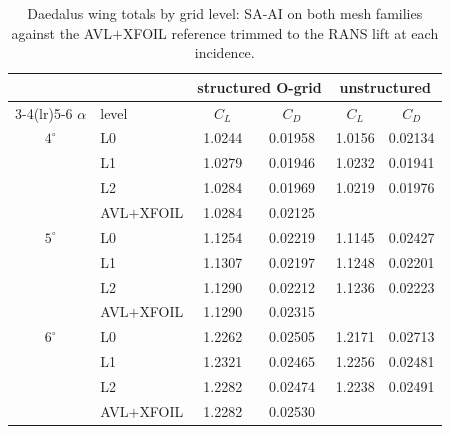 \documentclass[10pt]{article}
\begin{document}
\begin{table}[H]
  \centering\small
  \caption{Daedalus wing totals by grid level: SA-AI on both mesh
  families against the AVL$+$XFOIL reference trimmed to the RANS lift
  at each incidence.}
  \label{t:daetotals}
  \begin{tabular}{cl cc cc}
    \toprule
    & & \multicolumn{2}{c}{structured O-grid} & \multicolumn{2}{c}{unstructured}\\
    \cmidrule(lr){3-4}\cmidrule(lr){5-6}
    $\alpha$ & level & $C_L$ & $C_D$ & $C_L$ & $C_D$\\
    \midrule
    $4^\circ$ & L0 & 1.0244 & 0.01958 & 1.0156 & 0.02134\\
              & L1 & 1.0279 & 0.01946 & 1.0232 & 0.01941\\
              & L2 & 1.0284 & 0.01969 & 1.0219 & 0.01976\\
              & AVL$+$XFOIL & 1.0284 & 0.02125 & &\\
    \midrule
    $5^\circ$ & L0 & 1.1254 & 0.02219 & 1.1145 & 0.02427\\
              & L1 & 1.1307 & 0.02197 & 1.1248 & 0.02201\\
              & L2 & 1.1290 & 0.02212 & 1.1236 & 0.02223\\
              & AVL$+$XFOIL & 1.1290 & 0.02315 & &\\
    \midrule
    $6^\circ$ & L0 & 1.2262 & 0.02505 & 1.2171 & 0.02713\\
              & L1 & 1.2321 & 0.02465 & 1.2256 & 0.02481\\
              & L2 & 1.2282 & 0.02474 & 1.2238 & 0.02491\\
              & AVL$+$XFOIL & 1.2282 & 0.02530 & &\\
    \bottomrule
  \end{tabular}
\end{table}
\end{document}
